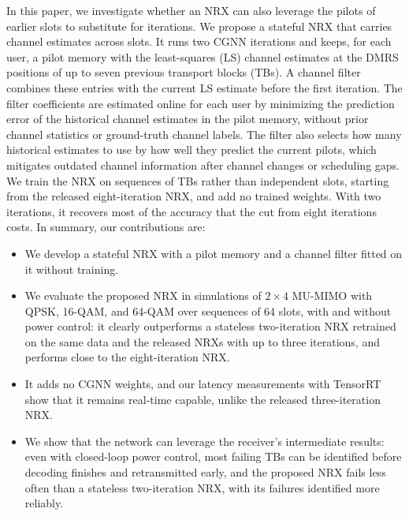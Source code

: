 In this paper, we investigate whether an NRX can also leverage the pilots of earlier slots to substitute for iterations. We propose a stateful NRX that carries channel estimates across slots. It runs two CGNN iterations and keeps, for each user, a pilot memory with the least-squares (LS) channel estimates at the DMRS positions of up to seven previous transport blocks (TBs). A channel filter combines these entries with the current LS estimate before the first iteration. The filter coefficients are estimated online for each user by minimizing the prediction error of the historical channel estimates in the pilot memory, without prior channel statistics or ground-truth channel labels. The filter also selects how many historical estimates to use by how well they predict the current pilots, which mitigates outdated channel information after channel changes or scheduling gaps. We train the NRX on sequences of TBs rather than independent slots, starting from the released eight-iteration NRX, and add no trained weights. With two iterations, it recovers most of the accuracy that the cut from eight iterations costs.
In summary, our contributions are:
\begin{itemize}
\item We develop a stateful NRX with a pilot memory and a channel filter fitted on it without training.
\item We evaluate the proposed NRX in simulations of $2\times 4$ MU-MIMO with QPSK, 16-QAM, and 64-QAM over sequences of 64 slots, with and without power control: it clearly outperforms a stateless two-iteration NRX retrained on the same data and the released NRXs with up to three iterations, and performs close to the eight-iteration NRX.
\item It adds no CGNN weights, and our latency measurements with TensorRT show that it remains real-time capable, unlike the released three-iteration NRX.
\item We show that the network can leverage the receiver's intermediate results: even with closed-loop power control, most failing TBs can be identified before decoding finishes and retransmitted early, and the proposed NRX fails less often than a stateless two-iteration NRX, with its failures identified more reliably.
\end{itemize}